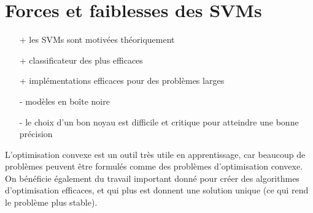 \section{Forces et faiblesses des SVMs}

\begin{itemize}
	\item[+] les SVMs sont motivées théoriquement
	\item[+] classificateur des plus efficaces
	\item[+] implémentations efficaces pour des problèmes larges
	\item[-] modèles en boîte noire
	\item[-] le choix d'un bon noyau est difficile et critique pour atteindre une bonne précision
\end{itemize}

L'optimisation convexe est un outil très utile en apprentissage, car beaucoup de problèmes peuvent être formulés comme des problèmes d'optimisation convexe. On bénéficie également du travail important donné pour créer des algorithmes d'optimisation efficaces, et qui plus est donnent une solution unique (ce qui rend le problème plus stable).